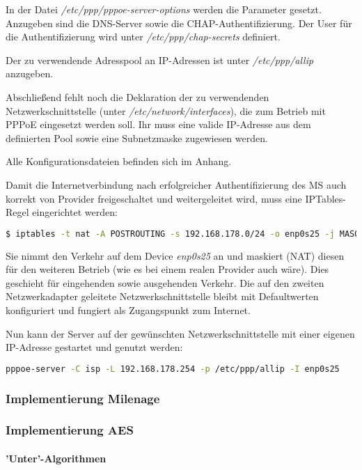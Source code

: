     	In der Datei \textit{/etc/ppp/pppoe-server-options} werden die Parameter gesetzt. Anzugeben
    	sind die DNS-Server sowie die CHAP-Authentifizierung. Der User für die Authentifizierung
    	wird unter \textit{/etc/ppp/chap-secrets} definiert.

    	Der zu verwendende Adresspool an IP-Adressen ist unter \textit{/etc/ppp/allip} anzugeben.

    	Abschließend fehlt noch die Deklaration der zu verwendenden Netzwerkschnittstelle (unter \textit{/etc/network/interfaces}),
    	die zum Betrieb mit PPPoE eingesetzt werden soll. Ihr muss eine valide IP-Adresse aus dem definierten
    	Pool sowie eine Subnetzmaske zugewiesen werden.

    	Alle Konfigurationsdateien befinden sich im Anhang. %

    	Damit die Internetverbindung nach erfolgreicher Authentifizierung des \ac{MS} auch
    	korrekt von Provider freigeschaltet und weitergeleitet wird, muss eine IPTables-Regel
    	eingerichtet werden:

    	\begin{lstlisting}[language=bash]
  			$ iptables -t nat -A POSTROUTING -s 192.168.178.0/24 -o enp0s25 -j MASQUERADE
		\end{lstlisting}

		Sie nimmt den Verkehr auf dem Device \textit{enp0s25} an und maskiert (\ac{NAT}) diesen
		für den weiteren Betrieb (wie es bei einem realen Provider auch wäre). Dies geschieht
		für eingehenden sowie ausgehenden Verkehr. Die auf den zweiten Netzwerkadapter geleitete
		Netzwerkschnittstelle bleibt mit Defaultwerten konfiguriert und fungiert als Zugangspunkt
		zum Internet.

		Nun kann der Server auf der gewünschten Netzwerkschnittstelle mit einer eigenen IP-Adresse
		gestartet und genutzt werden:
		\begin{lstlisting}[language=bash]
		pppoe-server -C isp -L 192.168.178.254 -p /etc/ppp/allip -I enp0s25
		\end{lstlisting}

		\subsubsection{Implementierung Milenage}
		\subsubsection{Implementierung AES}
			\paragraph{'Unter'-Algorithmen}

